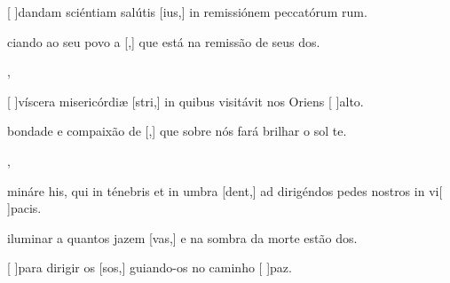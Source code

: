 {  {\item {}[ ]{dan}dam sciéntiam salútis [ius,] in remissiónem peccatórum rum.~\Antiphona}%
    {\item {}ciando ao seu povo a [,] que está na remissão de seus dos.~\Antiphona},
  {\item {}[ ]{ví}scera misericórdiæ [stri,] in quibus visitávit nos Oriens [ ]{al}to.~\Antiphona}%
    {\item {} bondade e compaixão de [,] que sobre nós fará brilhar o sol te.~\Antiphona},
  {\item {}mináre his, qui in ténebris et in umbra [dent,] ad dirigéndos pedes nostros in vi[ ]{pa}cis.~\Antiphona}%
    {\item {} iluminar a quantos jazem [vas,] e na sombra da morte estão dos.~\Antiphona
    \item {}[ ]{pa}ra dirigir os [sos,] guiando-os no caminho [ ]{paz}.~\Antiphona}
}